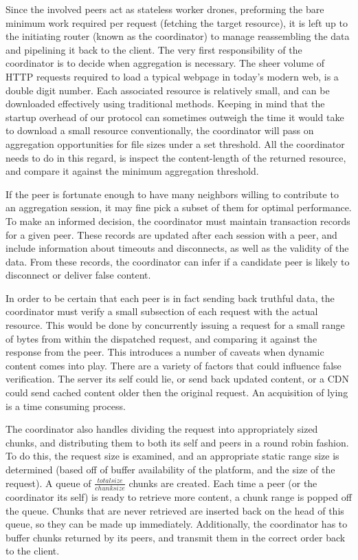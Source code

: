 \documentclass[12pt]{article}
\begin{document}
			Since the involved peers act as stateless worker drones, preforming the bare minimum work required per request (fetching the target resource), it is left up to the initiating router (known as the coordinator) to manage reassembling the data and pipelining it back to the client. The very first responsibility of the coordinator is to decide when aggregation is necessary. The sheer volume of HTTP requests required to load a typical webpage in today's modern web, is a double digit number. Each associated resource is relatively small, and can be downloaded effectively using traditional methods. Keeping in mind that the startup overhead of our protocol can sometimes outweigh the time it would take to download a small resource conventionally, the coordinator will pass on aggregation opportunities for file sizes under a set threshold. All the coordinator needs to do in this regard, is inspect the content-length of the returned resource, and compare it against the minimum aggregation threshold.

			If the peer is fortunate enough to have many neighbors willing to contribute to an aggregation session, it may fine pick a subset of them for optimal performance. To make an informed decision, the coordinator must maintain transaction records for a given peer. These records are updated after each session with a peer, and include information about timeouts and disconnects, as well as the validity of the data. From these records, the coordinator can infer if a candidate peer is likely to disconnect or deliver false content.

			In order to be certain that each peer is in fact sending back truthful data, the coordinator must verify a small subsection of each request with the actual resource. This would be done by concurrently issuing a request for a small range of bytes from within the dispatched request, and comparing it against the response from the peer. This introduces a number of caveats when dynamic content comes into play. There are a variety of factors that could influence false verification. The server its self could lie, or send back updated content, or a CDN could send cached content older then the original request. An acquisition of lying is a time consuming process. 

			The coordinator also handles dividing the request into appropriately sized chunks, and distributing them to both its self and peers in a round robin fashion. To do this, the request size is examined, and an appropriate static range size is determined (based off of buffer availability of the platform, and the size of the request). A queue of $\frac{total size}{chunk size}$ chunks are created. Each time a peer (or the coordinator its self) is ready to retrieve more content, a chunk range is popped off the queue. Chunks that are never retrieved are inserted back on the head of this queue, so they can be made up immediately. Additionally, the coordinator has to buffer chunks returned by its peers, and transmit them in the correct order back to the client. 
\end{document}
